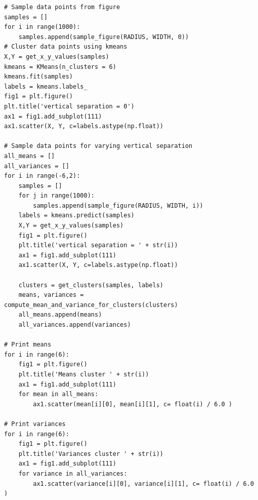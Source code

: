 \documentclass[paper=a4, fontsize=11pt]{scrartcl} %
\numberwithin{equation}{section} %
\numberwithin{figure}{section} %
\numberwithin{table}{section} %
\begin{document}
\begin{lstlisting}
# Sample data points from figure
samples = []
for i in range(1000):
    samples.append(sample_figure(RADIUS, WIDTH, 0))
# Cluster data points using kmeans
X,Y = get_x_y_values(samples)
kmeans = KMeans(n_clusters = 6)
kmeans.fit(samples)
labels = kmeans.labels_
fig1 = plt.figure()
plt.title('vertical separation = 0')
ax1 = fig1.add_subplot(111)
ax1.scatter(X, Y, c=labels.astype(np.float))

# Sample data points for varying vertical separation
all_means = []
all_variances = []
for i in range(-6,2):
    samples = []
    for j in range(1000):
        samples.append(sample_figure(RADIUS, WIDTH, i))
    labels = kmeans.predict(samples)
    X,Y = get_x_y_values(samples)
    fig1 = plt.figure()
    plt.title('vertical separation = ' + str(i))
    ax1 = fig1.add_subplot(111)
    ax1.scatter(X, Y, c=labels.astype(np.float))
    
    clusters = get_clusters(samples, labels)
    means, variances = compute_mean_and_variance_for_clusters(clusters)
    all_means.append(means)
    all_variances.append(variances)

# Print means
for i in range(6):
    fig1 = plt.figure()
    plt.title('Means cluster ' + str(i))
    ax1 = fig1.add_subplot(111)    
    for mean in all_means:
        ax1.scatter(mean[i][0], mean[i][1], c= float(i) / 6.0 )
        
# Print variances
for i in range(6):
    fig1 = plt.figure()
    plt.title('Variances cluster ' + str(i))
    ax1 = fig1.add_subplot(111)    
    for variance in all_variances:
        ax1.scatter(variance[i][0], variance[i][1], c= float(i) / 6.0 )
    


\end{lstlisting}
\end{document}
